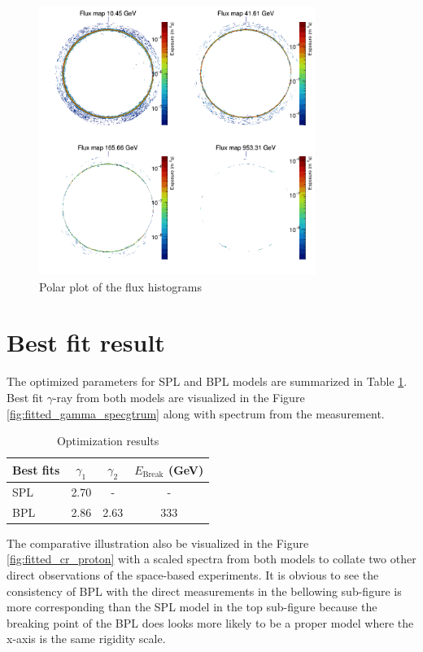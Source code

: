 \begin{figure}[h!]
    \centering
    \includegraphics[width=0.8\textwidth]{content/result_and_discussion/figures/polar_flxmaps.png}
    \caption{Polar plot of the flux histograms}
    \label{fig:flxmap_polar}
\end{figure}

\newpage

\section{Best fit result}

The optimized parameters for SPL and BPL models are summarized in 
Table \ref{tb:bestfit}. Best fit $\gamma$-ray from both models are 
visualized in the Figure \ref{fig:fitted_gamma_specgtrum} along
with spectrum from the measurement.

\begin{table}[h!]
    \centering
    \begin{tabular}{l | c | c | c}
      Best fits & $\gamma_1$ & $\gamma_2$ & $E_{\text{Break}}$ (GeV) \\
      \hline \hline
      SPL & 2.70 & - & -  \\
      BPL & 2.86  & 2.63 & 333
    \end{tabular}
    \caption{Optimization results}
    \label{tb:bestfit}
\end{table}

The comparative illustration
also be visualized in the Figure \ref{fig:fitted_cr_proton} with a 
scaled spectra from both models to collate two other direct 
observations of the space-based experiments. It is obvious to see 
the consistency of BPL with the direct measurements in the bellowing 
sub-figure is more corresponding than the SPL model in the top sub-figure
because the breaking point of the BPL does looks more likely to be 
a proper model where the x-axis is the same rigidity scale.

